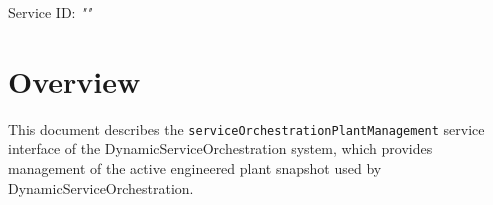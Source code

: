 \documentclass[a4paper]{arrowhead}
\begin{document}
\sloppy

\ArrowheadSetup

\begin{center}
  \vspace*{1cm}
  \huge{\arrowtitle}

  \vspace*{0.2cm}
  \LARGE{\arrowtype}
  \vspace*{1cm}

  \Large{Service ID: \textit{"\arrowid"}}

  \vspace*{\fill}


  \vspace*{1cm}
  \vspace*{\fill}

  \begin{abstract}
    This document describes the HTTP/1.1 protocol with TLS payload security and JSON payload encoding variant of the \texttt{service\allowbreak{}Orchestration\allowbreak{}Plant\allowbreak{}Management} service of the DynamicServiceOrchestration system.
  \end{abstract}

  \vspace*{1cm}
\end{center}

\newpage

\tableofcontents
\newpage

\section{Overview}
\label{sec:overview}

This document describes the \texttt{service\allowbreak{}Orchestration\allowbreak{}Plant\allowbreak{}Management} service interface of the DynamicServiceOrchestration system, which provides management of the active engineered plant snapshot used by Dynamic\allowbreak{}Service\allowbreak{}Orchestration.
\end{document}
